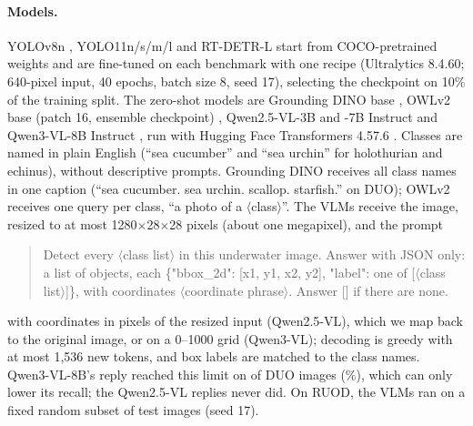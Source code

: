 \documentclass[letterpaper]{article} %
\begin{document}
\paragraph{Models.}
YOLOv8n \citep{jocher2023yolov8}, YOLO11n/s/m/l \citep{jocher2024yolo11} and RT-DETR-L \citep{zhao2024rtdetr} start from COCO-pretrained weights and are fine-tuned on each benchmark with one recipe (Ultralytics 8.4.60; 640-pixel input, 40 epochs, batch size 8, seed 17), selecting the checkpoint on 10\% of the training split. The zero-shot models are Grounding DINO base \citep{liu2024grounding}, OWLv2 base (patch 16, ensemble checkpoint) \citep{minderer2023scaling}, Qwen2.5-VL-3B and -7B Instruct \citep{bai2025qwen25vl} and Qwen3-VL-8B Instruct \citep{bai2025qwen3vl}, run with Hugging Face Transformers 4.57.6 \citep{wolf2020transformers}. Classes are named in plain English (``sea cucumber'' and ``sea urchin'' for holothurian and echinus), without descriptive prompts. Grounding DINO receives all class names in one caption (``sea cucumber. sea urchin. scallop. starfish.'' on DUO); OWLv2 receives one query per class, ``a photo of a $\langle$class$\rangle$''. The VLMs receive the image, resized to at most 1280$\times$28$\times$28 pixels (about one megapixel), and the prompt
\begin{quote}\small
Detect every $\langle$class list$\rangle$ in this underwater image. Answer with JSON only: a list of objects, each \{"bbox\_2d": [x1, y1, x2, y2], "label": one of [$\langle$class list$\rangle$]\}, with coordinates $\langle$coordinate phrase$\rangle$. Answer [] if there are none.
\end{quote}
with coordinates in pixels of the resized input (Qwen2.5-VL), which we map back to the original image, or on a 0--1000 grid (Qwen3-VL); decoding is greedy with at most 1,536 new tokens, and box labels are matched to the class names. Qwen3-VL-8B's reply reached this limit on \nCutQwenVL{} of \nRepQwenVL{} DUO images (\pctCutQwenVL\%), which can only lower its recall; the Qwen2.5-VL replies never did. On RUOD, the VLMs ran on a fixed random subset of \rSubset{} test images (seed 17).
\end{document}
